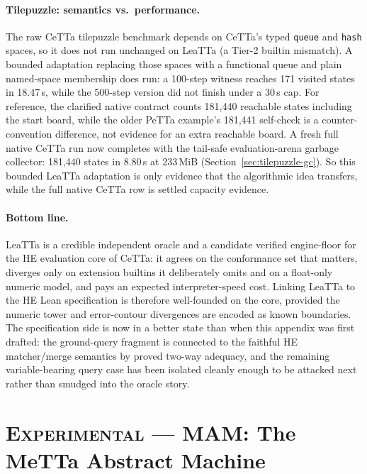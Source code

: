 \documentclass[11pt]{article}
\newcommand{\code}[1]{\texttt{#1}}
\newcommand{\PeTTa}{\textup{PeTTa}}
\newcommand{\HE}{\textup{HE}}
\newcommand{\CeTTa}{\textup{CeTTa}}
\newcommand{\LeaTTa}{\textup{LeaTTa}}
\begin{document}
\paragraph{Tilepuzzle: semantics vs.\ performance.}
The raw \CeTTa{} tilepuzzle benchmark depends on \CeTTa{}'s typed
\code{queue} and \code{hash} spaces, so it does not run unchanged on
\LeaTTa{} (a Tier-2 builtin mismatch).  A bounded adaptation replacing
those spaces with a functional queue and plain named-space membership
does run: a 100-step witness reaches 171 visited states in 18.47\,s,
while the 500-step version did not finish under a 30\,s cap.  For
reference, the clarified native contract counts
181{,}440 reachable states including the start board, while the older
\PeTTa{} example's 181{,}441 self-check is a counter-convention
difference, not evidence for an extra reachable board.  A fresh full
native \CeTTa{} run now completes with the tail-safe evaluation-arena
garbage collector:
181{,}440 states in 8.80\,s at 233\,MiB (Section~\ref{sec:tilepuzzle-gc}).
So this bounded \LeaTTa{} adaptation is only evidence that the algorithmic
idea transfers, while the full native \CeTTa{} row is settled capacity
evidence.

\paragraph{Bottom line.}
\LeaTTa{} is a credible independent oracle and a candidate verified
engine-floor for the \HE{} evaluation core of \CeTTa{}: it agrees on the
conformance set that matters, diverges only on extension builtins it
deliberately omits and on a float-only numeric model, and pays an
expected interpreter-speed cost.  Linking \LeaTTa{} to the \HE{} Lean
specification is therefore well-founded on the core, provided the
numeric tower and error-contour divergences are encoded as known
boundaries.  The specification side is now in a better state than when
this appendix was first drafted: the ground-query fragment is connected
to the faithful \HE{} matcher/merge semantics by proved two-way adequacy,
and the remaining variable-bearing query case has been isolated cleanly
enough to be attacked next rather than smudged into the oracle story.

\section{\textsc{Experimental} --- MAM: The MeTTa Abstract Machine}
\label{app:mam}
\end{document}

